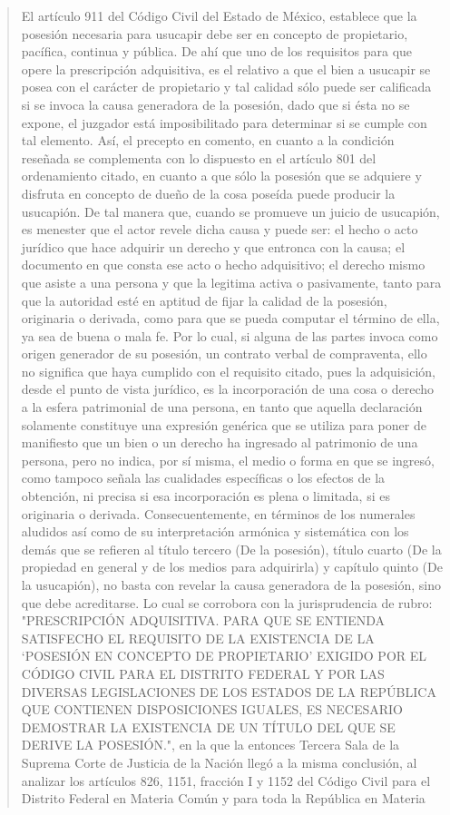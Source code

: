 \documentclass[11pt,a4paper]{article}
\begin{document}
\begin{quote}
El artículo 911 del Código Civil del Estado de México, establece que la posesión necesaria para
usucapir debe ser en concepto de propietario, pacífica, continua y pública. De ahí que uno de los
requisitos para que opere la prescripción adquisitiva, es el relativo a que el bien a usucapir se posea
con el carácter de propietario y tal calidad sólo puede ser calificada si se invoca la causa
generadora de la posesión, dado que si ésta no se expone, el juzgador está imposibilitado para
determinar si se cumple con tal elemento. Así, el precepto en comento, en cuanto a la condición
reseñada se complementa con lo dispuesto en el artículo 801 del ordenamiento citado, en cuanto a
que sólo la posesión que se adquiere y disfruta en concepto de dueño de la cosa poseída puede
producir la usucapión. De tal manera que, cuando se promueve un juicio de usucapión, es menester
que el actor revele dicha causa y puede ser: el hecho o acto jurídico que hace adquirir un derecho y
que entronca con la causa; el documento en que consta ese acto o hecho adquisitivo; el derecho
mismo que asiste a una persona y que la legitima activa o pasivamente, tanto para que la autoridad
esté en aptitud de fijar la calidad de la posesión, originaria o derivada, como para que se pueda
computar el término de ella, ya sea de buena o mala fe. Por lo cual, si alguna de las partes invoca
como origen generador de su posesión, un contrato verbal de compraventa, ello no significa que
haya cumplido con el requisito citado, pues la adquisición, desde el punto de vista jurídico, es la
incorporación de una cosa o derecho a la esfera patrimonial de una persona, en tanto que aquella
declaración solamente constituye una expresión genérica que se utiliza para poner de manifiesto
que un bien o un derecho ha ingresado al patrimonio de una persona, pero no indica, por sí misma,
el medio o forma en que se ingresó, como tampoco señala las cualidades específicas o los efectos
de la obtención, ni precisa si esa incorporación es plena o limitada, si es originaria o derivada.
Consecuentemente, en términos de los numerales aludidos así como de su interpretación armónica
y sistemática con los demás que se refieren al título tercero (De la posesión), título cuarto (De la
propiedad en general y de los medios para adquirirla) y capítulo quinto (De la usucapión), no basta
con revelar la causa generadora de la posesión, sino que debe acreditarse. Lo cual se corrobora
con la jurisprudencia de rubro: "PRESCRIPCIÓN ADQUISITIVA. PARA QUE SE ENTIENDA
SATISFECHO EL REQUISITO DE LA EXISTENCIA DE LA ‘POSESIÓN EN CONCEPTO DE
PROPIETARIO’ EXIGIDO POR EL CÓDIGO CIVIL PARA EL DISTRITO FEDERAL Y POR LAS
DIVERSAS LEGISLACIONES DE LOS ESTADOS DE LA REPÚBLICA QUE CONTIENEN
DISPOSICIONES IGUALES, ES NECESARIO DEMOSTRAR LA EXISTENCIA DE UN TÍTULO DEL
QUE SE DERIVE LA POSESIÓN.", en la que la entonces Tercera Sala de la Suprema Corte de
Justicia de la Nación llegó a la misma conclusión, al analizar los artículos 826, 1151, fracción I y
1152 del Código Civil para el Distrito Federal en Materia Común y para toda la República en Materia



\end{quote}
\end{document}
